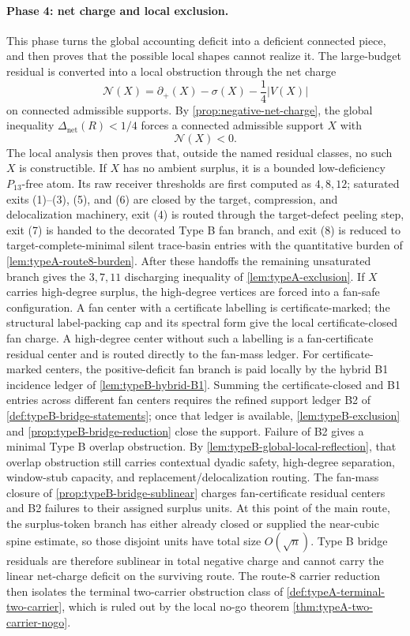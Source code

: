 \documentclass[11pt]{article}
\newcommand{\defp}{\partial_+}
\newcommand{\No}{\mathcal N}
\begin{document}
\paragraph{Phase 4: net charge and local exclusion.}
This phase turns the global accounting deficit into a deficient connected
piece, and then proves that the possible local shapes cannot realize it.
The large-budget residual is converted into a local obstruction through the net
charge
\[
\No(X)=\defp(X)-\sigma(X)-\frac14|V(X)|
\]
on connected admissible supports.  By
\cref{prop:negative-net-charge}, the global inequality
$\Delta_{\mathrm{net}}(R)<1/4$ forces a connected admissible support $X$ with
\[
\No(X)<0 .
\]
The local analysis then proves that, outside the named residual classes, no
such $X$ is constructible.  If $X$ has no ambient surplus, it is a bounded
low-deficiency $P_{13}$-free atom.  Its raw receiver thresholds are first
computed as $4,8,12$; saturated exits (1)--(3), (5), and (6) are closed by the
target, compression, and delocalization machinery, exit (4) is routed through
the target-defect peeling step, exit (7) is handed to the decorated Type B fan
branch, and exit (8) is reduced to target-complete-minimal silent trace-basin
entries with the quantitative burden of
\cref{lem:typeA-route8-burden}.  After these handoffs the remaining
unsaturated branch gives the $3,7,11$ discharging inequality of
\cref{lem:typeA-exclusion}.
If $X$ carries high-degree surplus, the high-degree vertices are forced into a
fan-safe configuration.  A fan center with a certificate labelling is
certificate-marked; the structural label-packing cap and its spectral form give
the local certificate-closed fan charge.  A high-degree center without such a
labelling is a fan-certificate residual center and is routed directly to the
fan-mass ledger.  For certificate-marked centers, the positive-deficit fan branch
is paid locally by the hybrid B1 incidence ledger of
\cref{lem:typeB-hybrid-B1}.  Summing the certificate-closed and B1 entries
across different fan centers requires the refined support ledger B2 of
\cref{def:typeB-bridge-statements}; once that ledger is available,
\cref{lem:typeB-exclusion} and \cref{prop:typeB-bridge-reduction} close the
support.  Failure of B2 gives a minimal Type B overlap obstruction.  By
\cref{lem:typeB-global-local-reflection}, that overlap obstruction still carries
contextual dyadic safety, high-degree separation, window-stub capacity, and
replacement/delocalization routing.  The fan-mass closure of
\cref{prop:typeB-bridge-sublinear} charges fan-certificate residual centers and
B2 failures to their assigned surplus units.  At this point of the main route,
the surplus-token branch has either already closed or supplied the near-cubic
spine estimate, so those disjoint units have total size \(O(\sqrt n)\).  Type B
bridge residuals are therefore sublinear in total negative charge and cannot
carry the linear net-charge deficit on the surviving route.  The route-8 carrier
reduction then isolates the terminal two-carrier obstruction class of
\cref{def:typeA-terminal-two-carrier}, which is ruled out by the local no-go
theorem \cref{thm:typeA-two-carrier-nogo}.
\end{document}
